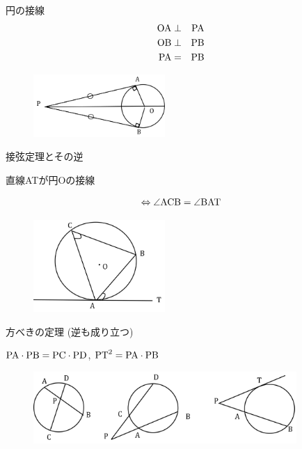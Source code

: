 \documentclass[aspectratio=169, 12pt]{beamer} %
\begin{document}
\begin{frame}{円の接線}
    \begin{eqnarray*}
        \rm{OA} &\perp& \rm{PA} \\
        \rm{OB} &\perp& \rm{PB} \\
        \rm{PA} &=& \rm{PB}
    \end{eqnarray*}
    \begin{figure}[htbp]
        \begin{center}
            \includegraphics[width=50mm]{fig/7.png}
        \end{center}
    \end{figure}
\end{frame}
\begin{frame}{接弦定理とその逆}
    \begin{center}
        直線ATが円Oの接線
    \end{center}
    \begin{eqnarray*}
        \Leftrightarrow \angle \rm{ACB} = \angle \rm{BAT}
    \end{eqnarray*}
    \begin{figure}[htbp]
        \begin{center}
            \includegraphics[width=50mm]{fig/8.png}
        \end{center}
    \end{figure}
\end{frame}
\begin{frame}{方べきの定理 (逆も成り立つ)}
    \begin{center}
        $\rm{PA}\cdot \rm{PB} = \rm{PC} \cdot \rm{PD}$, $\rm{PT}^2=\rm{PA}\cdot \rm{PB}$
    \end{center}
    \begin{figure}[htbp]
        \begin{center}
            \includegraphics[width=100mm]{fig/9.png}
        \end{center}
    \end{figure}
\end{frame}
\end{document}
